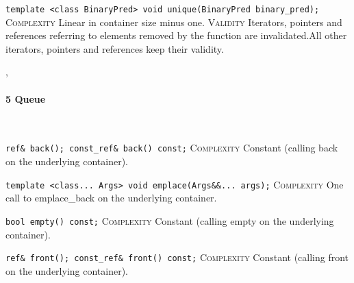 \noindent{}\hspace*{0.25em}\lstinline[basicstyle=\ttfamily\color{corange}]{template <class BinaryPred> void unique(BinaryPred binary_pred);} \textsc{Complexity} Linear in container size minus one. \textsc{Validity} Iterators, pointers and references referring to elements removed by the function are invalidated.All other iterators, pointers and references keep their validity.\\\vspace{-0.6em}


\sep
{}
\paragraph{5 Queue}\mbox{}\vspace{0.5em}\\
\noindent{}\hspace*{0.25em}\lstinline[basicstyle=\ttfamily\color{cgreen}]{ref& back(); const_ref& back() const;} \textsc{Complexity} Constant (calling back on the underlying container).\\\vspace{-0.6em}

\noindent{}\hspace*{0.25em}\lstinline{template <class... Args> void emplace(Args&&... args);} \textsc{Complexity} One call to emplace\_back on the underlying container.\\\vspace{-0.6em}

\noindent{}\hspace*{0.25em}\lstinline[basicstyle=\ttfamily\color{cgreen}]{bool empty() const;} \textsc{Complexity} Constant (calling empty on the underlying container).\\\vspace{-0.6em}

\noindent{}\hspace*{0.25em}\lstinline[basicstyle=\ttfamily\color{cgreen}]{ref& front(); const_ref& front() const;} \textsc{Complexity} Constant (calling front on the underlying container).\\\vspace{-0.6em}

